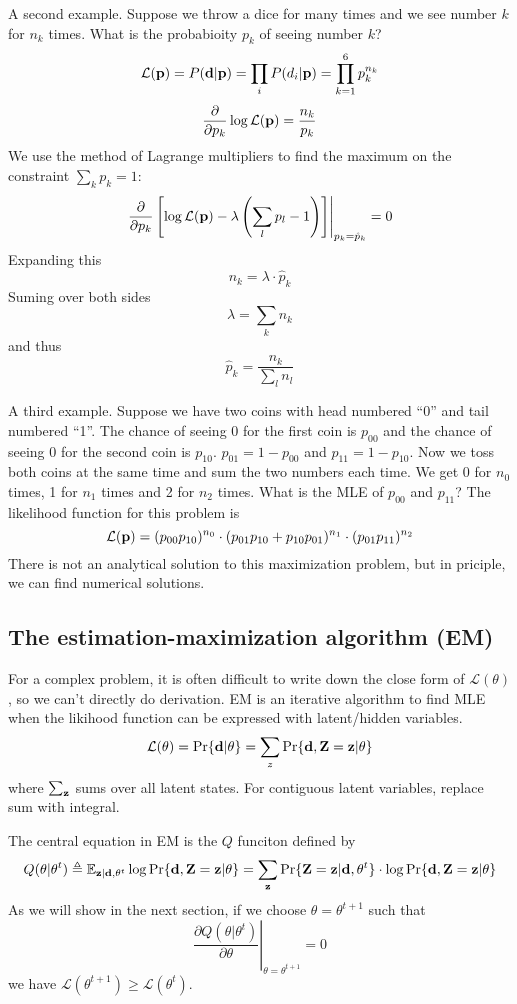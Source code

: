 \documentclass[10pt]{article}
\begin{document}
A second example. Suppose we throw a dice for many times and we see number $k$ for $n_k$ times.
What is the probabioity $p_k$ of seeing number $k$?
$$
\mathcal{L}({\bf p})=P({\bf d}|{\bf p})=\prod_iP(d_i|{\bf p})=\prod_{k=1}^6 p_k^{n_k}
$$
$$
\frac{\partial}{\partial p_k}\log\mathcal{L}({\bf p})=\frac{n_k}{p_k}
$$
We use the method of Lagrange multipliers to find the maximum on the constraint $\sum_kp_k=1$:
$$
\left.\frac{\partial}{\partial p_k}\left[\log\mathcal{L}({\bf p})-\lambda\left(\sum_lp_l-1\right)\right]\right|_{p_k=\hat{p}_k}=0
$$
Expanding this
$$
n_k=\lambda\cdot \hat{p}_k
$$
Suming over both sides
$$
\lambda=\sum_k n_k
$$
and thus
$$
\hat{p}_k = \frac{n_k}{\sum_ln_l}
$$

A third example.
Suppose we have two coins with head numbered ``0'' and tail numbered ``1''.
The chance of seeing 0 for the first coin is $p_{00}$ and the chance of seeing 0 for the second coin is $p_{10}$.
$p_{01}=1-p_{00}$ and $p_{11}=1-p_{10}$.
Now we toss both coins at the same time and sum the two numbers each time.
We get 0 for $n_0$ times, 1 for $n_1$ times and 2 for $n_2$ times.
What is the MLE of $p_{00}$ and $p_{11}$?
The likelihood function for this problem is
$$
\mathcal{L}({\bf p})=(p_{00}p_{10})^{n_0}\cdot(p_{01}p_{10}+p_{10}p_{01})^{n_1}\cdot(p_{01}p_{11})^{n_2}
$$
There is not an analytical solution to this maximization problem,
but in priciple, we can find numerical solutions.

\subsection{The estimation-maximization algorithm (EM)}

For a complex problem, it is often difficult to write down the close form of
$\mathcal{L}(\theta)$, so we can't directly do derivation. EM is an iterative
algorithm to find MLE when the likihood function can be expressed with
latent/hidden variables.
$$
\mathcal{L}(\theta)=\Pr\{{\bf d}|\theta\}=\sum_z\Pr\{{\bf d},{\bf Z}={\bf z}|\theta\}
$$
where $\sum_{\bf z}$ sums over all latent states. For contiguous latent
variables, replace sum with integral.

The central equation in EM is the $Q$ funciton defined by
$$
Q(\theta|\theta^t)\triangleq\mathbb{E}_{{\bf z}|{\bf d},\theta^t}\log\Pr\{{\bf d},{\bf Z}={\bf z}|\theta\}=\sum_{{\bf z}}\Pr\{{\bf Z}={\bf z}|{\bf d},\theta^t\}\cdot\log\Pr\{{\bf d},{\bf Z}={\bf z}|\theta\}
$$
As we will show in the next section, if we choose $\theta=\theta^{t+1}$ such that
$$
\left.\frac{\partial Q(\theta|\theta^t)}{\partial\theta}\right|_{\theta=\theta^{t+1}}=0
$$
we have $\mathcal{L}(\theta^{t+1})\ge\mathcal{L}(\theta^t)$.
\end{document}
